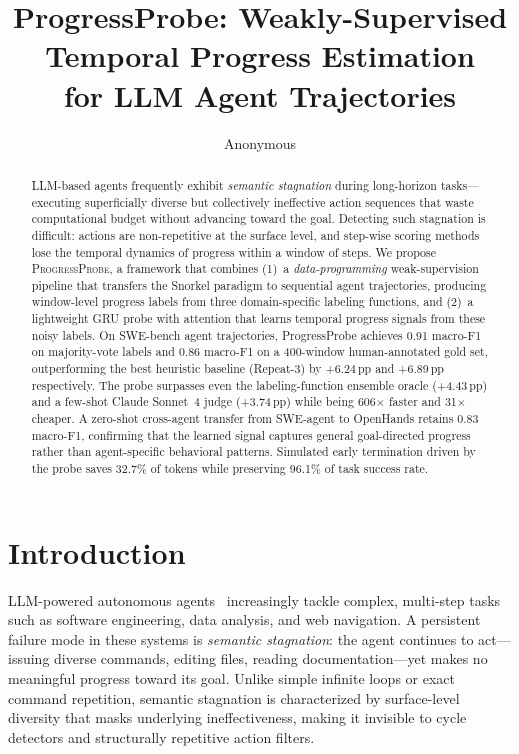 \documentclass[11pt,a4paper]{article}
\title{ProgressProbe: Weakly-Supervised Temporal Progress Estimation\\for LLM Agent Trajectories}
\author{Anonymous}
\begin{document}
\maketitle

\begin{abstract}
LLM-based agents frequently exhibit \emph{semantic stagnation} during long-horizon tasks---executing superficially diverse but collectively ineffective action sequences that waste computational budget without advancing toward the goal.
Detecting such stagnation is difficult: actions are non-repetitive at the surface level, and step-wise scoring methods lose the temporal dynamics of progress within a window of steps.
We propose \textsc{ProgressProbe}, a framework that combines (1)~a \emph{data-programming} weak-supervision pipeline that transfers the Snorkel paradigm to sequential agent trajectories, producing window-level progress labels from three domain-specific labeling functions, and (2)~a lightweight GRU probe with attention that learns temporal progress signals from these noisy labels.
On SWE-bench agent trajectories, ProgressProbe achieves 0.91 macro-F1 on majority-vote labels and 0.86 macro-F1 on a 400-window human-annotated gold set, outperforming the best heuristic baseline (Repeat-3) by +6.24\,pp and +6.89\,pp respectively.
The probe surpasses even the labeling-function ensemble oracle (+4.43\,pp) and a few-shot Claude Sonnet~4 judge (+3.74\,pp) while being 606$\times$ faster and 31$\times$ cheaper.
A zero-shot cross-agent transfer from SWE-agent to OpenHands retains 0.83 macro-F1, confirming that the learned signal captures general goal-directed progress rather than agent-specific behavioral patterns.
Simulated early termination driven by the probe saves 32.7\% of tokens while preserving 96.1\% of task success rate.
\end{abstract}

\section{Introduction}

LLM-powered autonomous agents~\cite{yang2024swe,wang2024opendevin} increasingly tackle complex, multi-step tasks such as software engineering, data analysis, and web navigation.
A persistent failure mode in these systems is \emph{semantic stagnation}: the agent continues to act---issuing diverse commands, editing files, reading documentation---yet makes no meaningful progress toward its goal.
Unlike simple infinite loops or exact command repetition, semantic stagnation is characterized by surface-level diversity that masks underlying ineffectiveness, making it invisible to cycle detectors and structurally repetitive action filters.
\end{document}
